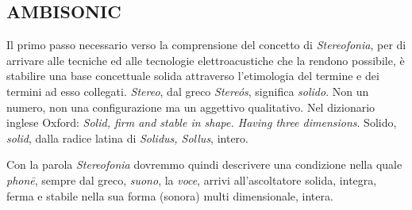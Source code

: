 \begin{refsection}

\chapter{AMBISONIC}
\startcontents[chapters]

\vfill\null

Il primo passo necessario verso la comprensione del concetto di \emph{Stereofonia},
per di arrivare alle tecniche ed alle tecnologie elettroacustiche che la
rendono possibile, è stabilire una base concettuale solida attraverso
l'etimologia del termine e dei termini ad esso collegati. \emph{Stereo}, dal greco
\emph{Stere\'os}, significa \emph{solido}. Non un numero, non una configurazione
ma un aggettivo qualitativo. Nel dizionario inglese Oxford: \emph{Solid, firm
and stable in shape. Having three dimensions}. Solido, \emph{solid}, dalla radice
latina di \emph{Solidus, Sollus}, intero.

Con la parola \emph{Stereofonia} dovremmo quindi descrivere una condizione
nella quale \emph{phon\={e}}, sempre dal greco, \emph{suono}, la \emph{voce},
arrivi all'ascoltatore solida, integra, ferma e stabile nella sua forma (sonora)
multi dimensionale, intera.









\printbibliography
\end{refsection}
